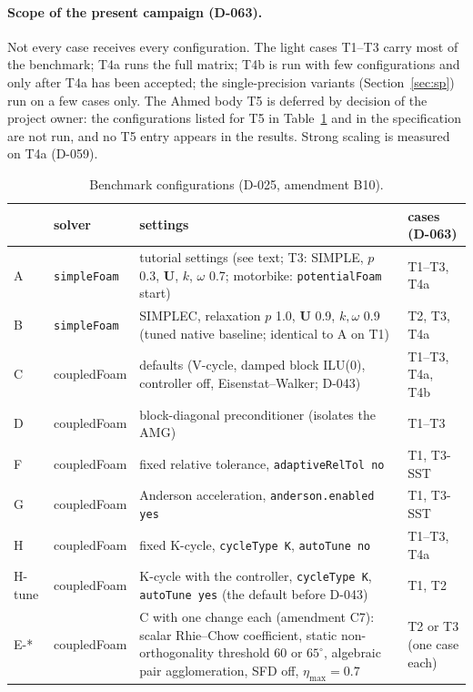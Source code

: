 \documentclass[11pt,a4paper]{article}
\newcommand{\vect}[1]{\mathbf{#1}}
\newcommand{\Uv}{\vect{U}}
\newcommand{\code}[1]{\texttt{#1}}
\begin{document}
\paragraph{Scope of the present campaign (D-063).} Not every case receives
every configuration. The light cases T1--T3 carry most of the benchmark;
T4a runs the full matrix; T4b is run with few configurations and only after
T4a has been accepted; the single-precision variants
(Section~\ref{sec:sp}) run on a few cases only. The Ahmed body T5 is
deferred by decision of the project owner: the configurations listed for
T5 in Table~\ref{tab:configs} and in the specification are not run, and
no T5 entry appears in the results. Strong scaling is measured on T4a
(D-059).

\begin{table}[tbp]
\centering\small
\caption{Benchmark configurations (D-025, amendment B10).}
\label{tab:configs}
\begin{tabular}{llp{6.2cm}p{2.6cm}}
\toprule
 & solver & settings & cases (D-063)\\
\midrule
A & \code{simpleFoam} & tutorial settings (see text; T3: SIMPLE, $p$ 0.3,
  $\Uv$, $k$, $\omega$ 0.7; motorbike: \code{potentialFoam} start) &
  T1--T3, T4a\\
B & \code{simpleFoam} & SIMPLEC, relaxation $p$ 1.0, $\Uv$ 0.9, $k,\omega$ 0.9
  (tuned native baseline; identical to A on T1) & T2, T3, T4a\\
C & coupledFoam & defaults (V-cycle, damped block ILU(0), controller off,
  Eisenstat--Walker; D-043) & T1--T3, T4a, T4b\\
D & coupledFoam & block-diagonal preconditioner (isolates the AMG) & T1--T3\\
F & coupledFoam & fixed relative tolerance, \code{adaptiveRelTol no} &
  T1, T3-SST\\
G & coupledFoam & Anderson acceleration, \code{anderson.enabled yes} &
  T1, T3-SST\\
H & coupledFoam & fixed K-cycle, \code{cycleType K}, \code{autoTune no} &
  T1--T3, T4a\\
H-tune & coupledFoam & K-cycle with the controller, \code{cycleType K},
  \code{autoTune yes} (the default before D-043) & T1, T2\\
E-* & coupledFoam & C with one change each (amendment C7): scalar
  Rhie--Chow coefficient, static non-orthogonality threshold 60 or
  $65^\circ$, algebraic pair agglomeration, SFD off, $\eta_{\max}=0.7$ &
  T2 or T3 (one case each)\\
\bottomrule
\end{tabular}
\end{table}
\end{document}
